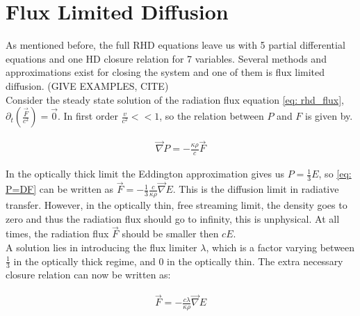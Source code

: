 \section{Flux Limited Diffusion} \label{section: introduction Flux Limited Diffusion}
As mentioned before, the full RHD equations leave us with 5 partial differential equations and one HD closure relation for 7 variables. Several methods and approximations exist for closing the system and one of them is flux limited diffusion. (GIVE EXAMPLES, CITE)\\

Consider the steady state solution of the radiation flux equation \eqref{eq: rhd_flux}, $\partial_t \left(\frac{\vec{F}}{c^2} \right) = \vec{0}$. In first order $\frac{v}{c^2} << 1$, so the relation between $P$ and $F$ is given by.

\begin{align}
\vec{\nabla} P = - \frac{\kappa \rho}{c} \vec{F} \label{eq: P=DF}
\end{align}

In the optically thick limit the Eddington approximation gives us $P = \frac{1}{3}E$, so \eqref{eq: P=DF} can be written as $\vec{F} = -\frac{1}{3}\frac{c}{\kappa \rho} \vec{\nabla}E$. This is the diffusion limit in radiative transfer. However, in the optically thin, free streaming limit, the density goes to zero and thus the radiation flux should go to infinity, this is unphysical. At all times, the radiation flux $\vec{F}$ should be smaller then $cE$.\\
 A solution lies in introducing the flux limiter $\lambda$, which is a factor varying between $\frac{1}{3}$ in the optically thick regime, and $0$ in the optically thin. The extra necessary closure relation can now be written as:

\begin{align}
\vec{F} = -\frac{c\lambda}{\kappa \rho} \vec{\nabla}E \label{eq: fld_closing}
\end{align}

